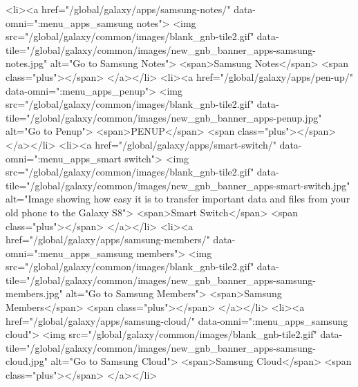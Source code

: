 							<li><a href="/global/galaxy/apps/samsung-notes/" data-omni=":menu_apps_samsung notes">
								<img src="/global/galaxy/common/images/blank_gnb-tile2.gif"
									data-tile="/global/galaxy/common/images/new_gnb_banner_apps-samsung-notes.jpg"
									alt="Go to Samsung Notes">
								<span>Samsung Notes</span>
								<span class="plus"></span>
							</a></li>
							<li><a href="/global/galaxy/apps/pen-up/" data-omni=":menu_apps_penup">
								<img src="/global/galaxy/common/images/blank_gnb-tile2.gif"
									data-tile="/global/galaxy/common/images/new_gnb_banner_apps-penup.jpg"
									alt="Go to Penup">
								<span>PENUP</span>
								<span class="plus"></span>
							</a></li>
							<li><a href="/global/galaxy/apps/smart-switch/" data-omni=":menu_apps_smart switch">
								<img src="/global/galaxy/common/images/blank_gnb-tile2.gif"
									data-tile="/global/galaxy/common/images/new_gnb_banner_apps-smart-switch.jpg"
									alt="Image showing how easy it is to transfer important data and files from your old phone to the Galaxy S8">
								<span>Smart Switch</span>
								<span class="plus"></span>
							</a></li>
							<li><a href="/global/galaxy/apps/samsung-members/" data-omni=":menu_apps_samsung members">
								<img src="/global/galaxy/common/images/blank_gnb-tile2.gif"
									data-tile="/global/galaxy/common/images/new_gnb_banner_apps-samsung-members.jpg"
									alt="Go to Samsung Members">
								<span>Samsung Members</span>
								<span class="plus"></span>
							</a></li>
							<li><a href="/global/galaxy/apps/samsung-cloud/" data-omni=":menu_apps_samsung cloud">
								<img src="/global/galaxy/common/images/blank_gnb-tile2.gif"
									data-tile="/global/galaxy/common/images/new_gnb_banner_apps-samsung-cloud.jpg"
									alt="Go to Samsung Cloud">
								<span>Samsung Cloud</span>
								<span class="plus"></span>
							</a></li>

